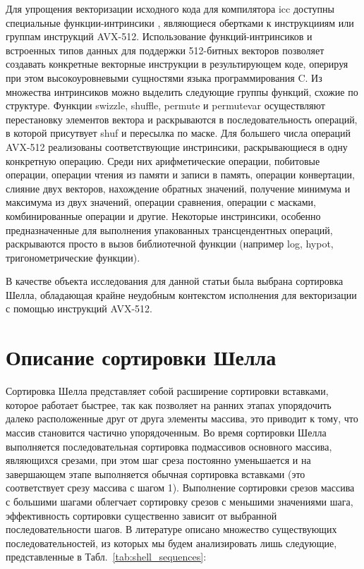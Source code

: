 \documentclass[utf8]{psta}
\begin{document}
Для упрощения векторизации исходного кода для компилятора icc доступны специальные функции-интринсики \cite{compiler_guide, intrinsic_guide}, являющиеся обертками к инструкцииям или группам инструкций AVX-512. 
Использование функций-интринсиков и встроенных типов данных для поддержки 512-битных векторов позволяет создавать конкретные векторные инструкции в результирующем коде, оперируя при этом высокоуровневыми сущностями языка программирования C. 
Из множества интринсиков можно выделить следующие группы функций, схожие по структуре. Функции swizzle, shuffle, permute и permutevar осуществляют перестановку элементов вектора и раскрываются в последовательность операций, в которой присутвует shuf и пересылка по маске. Для большего числа операций AVX-512 реализованы соответствующие инстринсики, раскрывающиеся в одну конкретную операцию. 
Среди них арифметические операции, побитовые операции, операции чтения из памяти и записи в память, операции конвертации, слияние двух векторов, нахождение обратных значений, получение минимума и максимума из двух значений, операции сравнения, операции с масками, комбинированные операции и другие. 
Некоторые инстринсики, особенно предназначенные для выполнения упакованных трансцендентных операций, раскрываются просто в вызов библиотечной функции (например log, hypot, тригонометрические функции).

В качестве объекта исследования для данной статьи была выбрана сортировка Шелла, обладающая крайне неудобным контекстом исполнения для векторизации с помощью инструкций AVX-512. 

\section{Описание сортировки Шелла}

Сортировка Шелла \cite{Knuth} представляет собой расширение сортировки вставками, которое работает быстрее, так как позволяет на ранних этапах упорядочить далеко расположенные друг от друга элементы массива, это приводит к тому, что массив становится частично упорядоченным. 
Во время сортировки Шелла выполняется последовательная сортировка подмассивов основного массива, являющихся срезами, при этом шаг среза постоянно уменьшается и на завершающем этапе выполняется обычная сортировка вставками (это соответствует срезу массива с шагом 1).
Выполнение сортировки срезов массива с большими шагами облегчает сортировку срезов с меньшими значениями шага, эффективность сортировки существенно зависит от выбранной последовательности шагов. 
В литературе описано множество существующих последовательностей, из которых мы будем анализировать лишь следующие, представленные в Табл.~\ref{tab:shell_sequences}:
\end{document}
